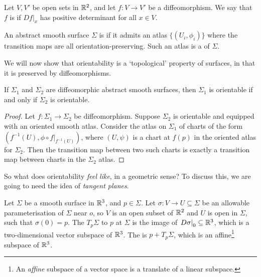 \documentclass[a4paper]{article}
\begin{document}
\begin{definition}
    Let $V, V'$ be open sets in $\mathbb{R}^2$, and let $f: V \rightarrow V'$ be a diffeomorphism. We say that $f$ is  if $\left. Df\right|_x$ has positive determinant for all $x \in V$.
\end{definition}

\begin{definition}[Orientability]
An abstract smooth surface $\Sigma$ is  if it admits an atlas $\{(U_i, \phi_i)\}$ where the transition maps are all orientation-preserving. Such an atlas is a  of $\Sigma$.
\end{definition}

We will now show that orientability is a `topological' property of surfaces, in that it is preserved by diffeomorphisms.

\begin{theorem}
    If $\Sigma_1$ and $\Sigma_2$ are diffeomorphic abstract smooth surfaces, then $\Sigma_1$ is orientable if and only if $\Sigma_2$ is orientable.
\end{theorem}
\begin{proof}
    Let $f: \Sigma_1 \rightarrow \Sigma_2$ be diffeomorphism. Suppose $\Sigma_2$ is orientable and equipped with an oriented smooth atlas. Consider the atlas on $\Sigma_1$ of charts of the form $(f^{-1}(U), \phi \circ \left.f\right|_{f^{-1}(U)})$, where $(U, \psi)$ is a chart at $f(p)$ in the oriented atlas for $\Sigma_2$. Then the transition map between two such charts is exactly a transition map between charts in the $\Sigma_2$ atlas. 
\end{proof}

So what does orientability \emph{feel like}, in a geometric sense? To discuss this, we are going to need the idea of \emph{tangent planes}.

\begin{definition}
Let $\Sigma$ be a smooth surface in $\mathbb{R}^3$, and $p \in \Sigma$. Let $\sigma: V \rightarrow U \subseteq \Sigma$ be an allowable parameterisation of $\Sigma$ near $o$, so $V$ is an open subset of $\mathbb{R}^2$ and $U$ is open in $\Sigma$, such that $\sigma(0) = p$. The  $T_p \Sigma$ to $p$ at $\Sigma$ is the image of $\left.D\sigma \right|_0 \subseteq \mathbb{R}^3$, which is a two-dimensional vector subspace of $\mathbb{R}^3$. The  is $p + T_p \Sigma$, which is an affine\footnote{An \emph{affine} subspace of a vector space is a translate of a linear subspace.} subspace of $\mathbb{R}^3$.
\end{definition}
\end{document}
